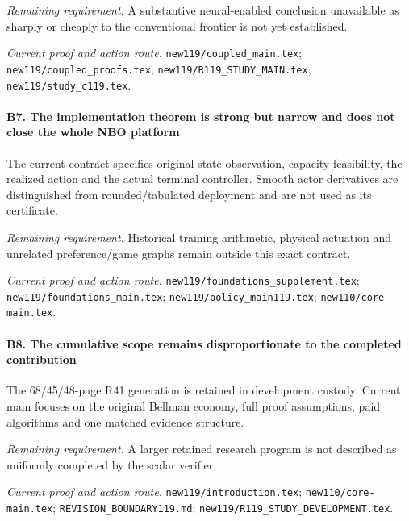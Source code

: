 \par\emph{Remaining requirement.} A substantive neural-enabled conclusion unavailable as sharply or cheaply to the conventional frontier is not yet established.

\par\emph{Current proof and action route.} \nolinkurl{new119/coupled_main.tex}; \nolinkurl{new119/coupled_proofs.tex}; \nolinkurl{new119/R119_STUDY_MAIN.tex}; \nolinkurl{new119/study_c119.tex}.

\paragraph{B7. The implementation theorem is strong but narrow and does not close the whole NBO platform}

The current contract specifies original state observation, capacity feasibility, the realized action and the actual terminal controller. Smooth actor derivatives are distinguished from rounded/\allowbreak{}tabulated deployment and are not used as its certificate.

\par\emph{Remaining requirement.} Historical training arithmetic, physical actuation and unrelated preference/\allowbreak{}game graphs remain outside this exact contract.

\par\emph{Current proof and action route.} \nolinkurl{new119/foundations_supplement.tex}; \nolinkurl{new119/foundations_main.tex}; \nolinkurl{new119/policy_main119.tex}; \nolinkurl{new110/core-main.tex}.

\paragraph{B8. The cumulative scope remains disproportionate to the completed contribution}

The 68/45/48-page R41 generation is retained in development custody. Current main focuses on the original Bellman economy, full proof assumptions, paid algorithms and one matched evidence structure.

\par\emph{Remaining requirement.} A larger retained research program is not described as uniformly completed by the scalar verifier.

\par\emph{Current proof and action route.} \nolinkurl{new119/introduction.tex}; \nolinkurl{new110/core-main.tex}; \nolinkurl{REVISION_BOUNDARY119.md}; \nolinkurl{new119/R119_STUDY_DEVELOPMENT.tex}.


